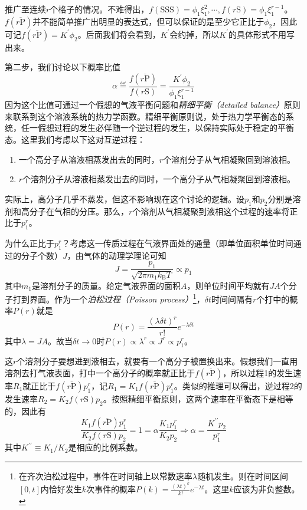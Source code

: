 \documentclass[main.tex]{subfiles}
\begin{document}
推广至连续$r$个格子的情况。不难得出，$f\left(\text{SSS}\right)=\phi_1\xi_1^2,\cdots,f\left(r\text{S}\right)=\phi_1\xi_1^{r-1}$。$f\left(\overline{r\text{P}}\right)$并不能简单推广出明显的表达式，但可以保证的是至少它正比于$\phi_2$，因此可记$f\left(\overline{r\text{P}}\right)=K^\prime\phi_2$。后面我们将会看到，$K^\prime$会约掉，所以$K^\prime$的具体形式不用写出来。

第二步，我们讨论以下概率比值
\[\alpha\eqdef\frac{f\left(\overline{r\text{P}}\right)}{f\left(r\text{S}\right)}=\frac{K^\prime\phi_2}{\phi_1\xi_1^{r-1}}\]
因为这个比值可通过一个假想的气液平衡问题和\emph{精细平衡（detailed balance）}原则来联系到这个溶液系统的热力学函数。精细平衡原则说，处于热力学平衡态的系统，任一假想过程的发生必伴随一个逆过程的发生，以保持实际处于稳定的平衡态。这里我们考虑以下这对互逆过程：
\begin{enumerate}
    \item 一个高分子从溶液相蒸发出去的同时，$r$个溶剂分子从气相凝聚回到溶液相。
    \item $r$个溶剂分子从溶液相蒸发出去的同时，一个高分子从气相凝聚回到溶液相。
\end{enumerate}
实际上，高分子几乎不蒸发，但这不影响现在这个讨论的逻辑。设$p_1$和$p_2$分别是溶剂和高分子在气相的分压。那么，$r$个溶剂从气相凝聚到液相这个过程的速率将正比于$p_1^r$。

为什么正比于$p_1^r$？考虑这一传质过程在气液界面处的通量（即单位面积单位时间通过的分子个数）$J$，由气体的动理学理论可知
\[J=\frac{p_1}{\sqrt{2\pi m_1 k_\text{B}T}}\propto p_1\]
其中$m_1$是溶剂分子的质量。给定气液界面的面积$A$，则单位时间平均就有$JA$个分子打到界面。作为一个\emph{泊松过程（Poisson process）}\footnote{在齐次泊松过程中，事件在时间轴上以常数速率$\lambda$随机发生。则在时间区间$\left[0,t\right]$内恰好发生$k$次事件的概率$P\left(k\right)=\frac{\left(\lambda t\right)^k}{k!}e^{-\lambda t}$。这里$k$应该为非负整数。}，$\delta t$时间间隔有$r$个打中的概率$P\left(r\right)$就是
\[P\left(r\right)=\frac{\left(\lambda\delta t\right)^r}{r!}e^{-\lambda\delta t}\]
其中$\lambda=JA$。故当$\delta t\to 0$时$P\left(r\right)\propto\lambda^r\propto J^r\propto p_1^r$。

这$r$个溶剂分子要想进到液相去，就要有一个高分子被置换出来。假想我们一直用溶剂去打气液表面，打中一个高分子的概率就正比于$f\left(\overline{r\text{P}}\right)$，所以过程1的发生速率$R_1$就正比于$f\left(\overline{r\text{P}}\right)p_1^r$，记$R_1=K_1f\left(\overline{r\text{P}}\right)p_1^r$。类似的推理可以得出，逆过程2的发生速率$R_2=K_2f\left(r\text{S}\right)p_2$。按照精细平衡原则，这两个速率在平衡态下是相等的，因此有
\[\frac{K_1f\left(\overline{r\text{P}}\right)p_1^r}{K_2f\left(r\text{S}\right)p_2}=1=\alpha\frac{K_1p_1^r}{K_2p_2}\Rightarrow\alpha=\frac{K^{\prime\prime}p_2}{p_1^r}\]
其中$K^{\prime\prime}\equiv K_1/K_2$是相应的比例系数。
\end{document}
